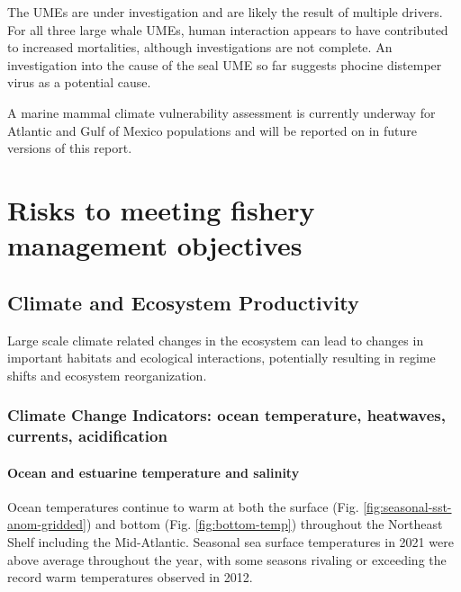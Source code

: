 \documentclass[
  10pt,
]{article}
\begin{document}
The UMEs are under investigation and are likely the result of multiple
drivers. For all three large whale UMEs, human interaction appears to
have contributed to increased mortalities, although investigations are
not complete. An investigation into the cause of the seal UME so far
suggests phocine distemper virus as a potential cause.

A marine mammal climate vulnerability assessment is currently underway
for Atlantic and Gulf of Mexico populations and will be reported on in
future versions of this report.

\hypertarget{risks-to-meeting-fishery-management-objectives}{%
\section{Risks to meeting fishery management
objectives}\label{risks-to-meeting-fishery-management-objectives}}

\hypertarget{climate-and-ecosystem-productivity}{%
\subsection{Climate and Ecosystem
Productivity}\label{climate-and-ecosystem-productivity}}

Large scale climate related changes in the ecosystem can lead to changes
in important habitats and ecological interactions, potentially resulting
in regime shifts and ecosystem reorganization.

\hypertarget{climate-change-indicators-ocean-temperature-heatwaves-currents-acidification}{%
\subsubsection{Climate Change Indicators: ocean temperature, heatwaves,
currents,
acidification}\label{climate-change-indicators-ocean-temperature-heatwaves-currents-acidification}}

\hypertarget{ocean-and-estuarine-temperature-and-salinity}{%
\paragraph{Ocean and estuarine temperature and
salinity}\label{ocean-and-estuarine-temperature-and-salinity}}

Ocean temperatures continue to warm at both the surface (Fig.
\ref{fig:seasonal-sst-anom-gridded}) and bottom (Fig.
\ref{fig:bottom-temp}) throughout the Northeast Shelf including the
Mid-Atlantic. Seasonal sea surface temperatures in 2021 were above
average throughout the year, with some seasons rivaling or exceeding the
record warm temperatures observed in 2012.
\end{document}
